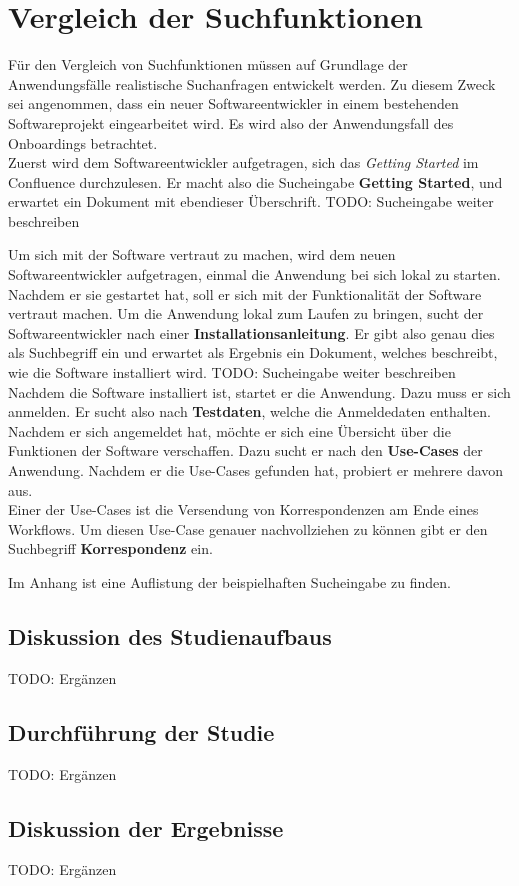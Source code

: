 \chapter{Vergleich der Suchfunktionen}
\label{chap:vergleich-der-suchfunktionen}
Für den Vergleich von Suchfunktionen müssen auf Grundlage der Anwendungsfälle realistische Suchanfragen entwickelt werden.
Zu diesem Zweck sei angenommen, dass ein neuer Softwareentwickler in einem bestehenden Softwareprojekt eingearbeitet wird.
Es wird also der Anwendungsfall des Onboardings betrachtet.\\

Zuerst wird dem Softwareentwickler aufgetragen, sich das \textit{Getting Started} im Confluence durchzulesen.
Er macht also die Sucheingabe \textbf{Getting Started}, und erwartet ein Dokument mit ebendieser Überschrift. 
TODO: Sucheingabe weiter beschreiben

Um sich mit der Software vertraut zu machen, wird dem neuen Softwareentwickler aufgetragen, einmal die Anwendung bei sich lokal zu starten.
Nachdem er sie gestartet hat, soll er sich mit der Funktionalität der Software vertraut machen.
Um die Anwendung lokal zum Laufen zu bringen, sucht der Softwareentwickler nach einer \textbf{Installationsanleitung}.
Er gibt also genau dies als Suchbegriff ein und erwartet als Ergebnis ein Dokument, welches beschreibt, wie die Software installiert wird.
TODO: Sucheingabe weiter beschreiben\\

Nachdem die Software installiert ist, startet er die Anwendung.
Dazu muss er sich anmelden.
Er sucht also nach \textbf{Testdaten}, welche die Anmeldedaten enthalten.
Nachdem er sich angemeldet hat, möchte er sich eine Übersicht über die Funktionen der Software verschaffen.
Dazu sucht er nach den \textbf{Use-Cases} der Anwendung.
Nachdem er die Use-Cases gefunden hat, probiert er mehrere davon aus.\\

Einer der Use-Cases ist die Versendung von Korrespondenzen am Ende eines Workflows.
Um diesen Use-Case genauer nachvollziehen zu können gibt er den Suchbegriff \textbf{Korrespondenz} ein.



Im Anhang ist eine Auflistung der beispielhaften Sucheingabe zu finden.

\section{Diskussion des Studienaufbaus}
TODO: Ergänzen

\section{Durchführung der Studie}
TODO: Ergänzen

\section{Diskussion der Ergebnisse}
TODO: Ergänzen
